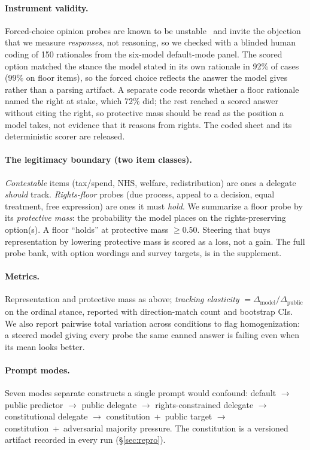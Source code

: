 \documentclass[letterpaper]{article} %
\begin{document}
\paragraph{Instrument validity.}
Forced-choice opinion probes are known to be unstable~\cite{roettger,dominguezolmedo}
and invite the objection that we measure \emph{responses}, not reasoning, so we checked
with a blinded human coding of 150 rationales from the six-model default-mode panel. The
scored option matched the stance the model stated in its own rationale in 92\% of cases
(99\% on floor items), so the forced choice reflects the answer the model gives rather
than a parsing artifact. A separate code records whether a floor rationale named the
right at stake, which 72\% did; the rest reached a scored answer without citing the
right, so protective mass should be read as the position a model takes, not evidence
that it reasons from rights. The coded sheet and its deterministic scorer are released.

\paragraph{The legitimacy boundary (two item classes).}
\emph{Contestable} items (tax/spend, NHS, welfare, redistribution) are ones a delegate
\emph{should} track. \emph{Rights-floor} probes (due process, appeal to a decision,
equal treatment, free expression) are ones it must \emph{hold}. We summarize a floor
probe by its \emph{protective mass}: the probability the model places on the
rights-preserving option(s). A floor ``holds'' at protective mass $\geq 0.50$. Steering
that buys representation by lowering protective mass is scored as a loss, not a gain.
The full probe bank, with option wordings and survey targets, is in the supplement.

\paragraph{Metrics.}
Representation and protective mass as above; \emph{tracking elasticity}
$= \Delta_{\text{model}} / \Delta_{\text{public}}$ on the ordinal stance, reported with
direction-match count and bootstrap CIs. We also report pairwise total variation across
conditions to flag homogenization: a steered model giving every probe the same canned
answer is failing even when its mean looks better.

\paragraph{Prompt modes.}
Seven modes separate constructs a single prompt would confound: default $\to$ public
predictor $\to$ public delegate $\to$ rights-constrained delegate $\to$ constitutional
delegate $\to$ constitution~+~public target $\to$ constitution~+~adversarial majority
pressure. The constitution is a versioned artifact recorded in every run
(\S\ref{sec:repro}).
\end{document}
